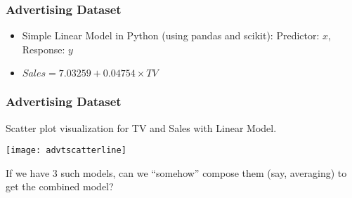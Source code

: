 \begin{frame}[fragile]\frametitle{Advertising Dataset}
\begin{itemize}
\item Simple Linear Model in Python (using pandas and scikit): Predictor: $x$, Response: $y$
%
\item $Sales = 7.03259 + 0.04754  \times  TV$
\end{itemize}
\end{frame}

\begin{frame}[fragile]\frametitle{Advertising Dataset}
Scatter plot visualization for TV and Sales with Linear Model.
%
\begin{center}
\texttt{[image: advtscatterline]}
\end{center}

If we have 3 such models, can we ``somehow'' compose them (say, averaging) to get the combined model?

\end{frame}

